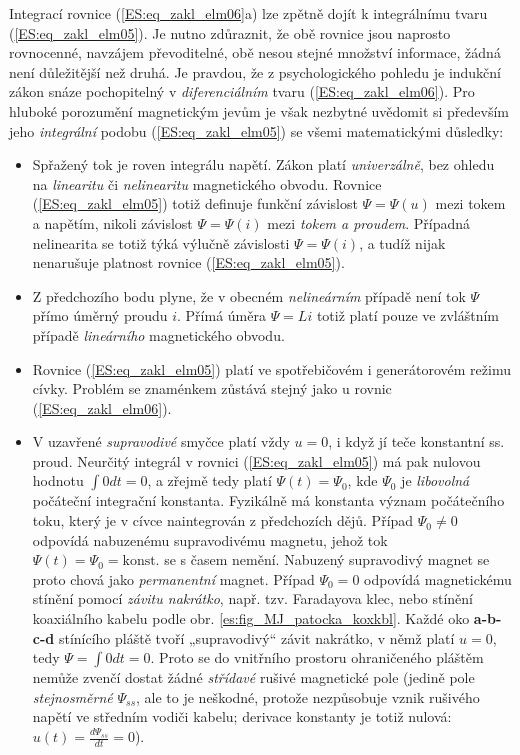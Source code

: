     Integrací rovnice (\ref{ES:eq_zakl_elm06}a) lze zpětně dojít k integrálnímu tvaru
    (\ref{ES:eq_zakl_elm05}). Je nutno zdůraznit, že obě rovnice jsou naprosto rovnocenné, navzájem
    převoditelné, obě nesou stejné množství informace, žádná není důležitější než druhá. Je
    pravdou, že z psychologického pohledu je indukční zákon snáze pochopitelný v
    \emph{diferenciálním} tvaru (\ref{ES:eq_zakl_elm06}). Pro hluboké porozumění magnetickým jevům
    je však nezbytné uvědomit si především jeho \emph{integrální} podobu (\ref{ES:eq_zakl_elm05})
    se všemi matematickými důsledky:
    \begin{itemize}
      \item Spřažený tok je roven integrálu napětí. Zákon platí \emph{univerzálně}, bez ohledu na
            \emph{linearitu} či \emph{nelinearitu} magnetického obvodu. Rovnice
            (\ref{ES:eq_zakl_elm05}) totiž definuje funkční závislost \(\Psi=\Psi(u)\) mezi tokem a
            napětím, nikoli závislost \(\Psi=\Psi(i)\) mezi \emph{tokem a proudem}.  Případná
            nelinearita se totiž týká výlučně závislosti \(\Psi=\Psi(i)\), a tudíž nijak nenarušuje
            platnost rovnice (\ref{ES:eq_zakl_elm05}).
      \item Z předchozího bodu plyne, že v obecném \emph{nelineárním} případě není tok \(\Psi\)
            přímo úměrný proudu \(i\). Přímá úměra \(\Psi = Li\) totiž platí pouze ve zvláštním
            případě \emph{lineárního} magnetického obvodu.
      \item Rovnice (\ref{ES:eq_zakl_elm05}) platí ve spotřebičovém i generátorovém režimu cívky.
            Problém se znaménkem zůstává stejný jako u rovnic (\ref{ES:eq_zakl_elm06}).
      \item V uzavřené \emph{supravodivé} smyčce platí vždy \(u = 0\), i když jí teče konstantní
            ss. proud. Neurčitý integrál v rovnici (\ref{ES:eq_zakl_elm05}) má pak nulovou hodnotu
            \(\int0dt=0\), a zřejmě tedy platí \(\Psi(t)=\Psi_0\), kde \(\Psi_0\) je
            \emph{libovolná} počáteční integrační konstanta. Fyzikálně má konstanta význam
            počátečního toku, který je v cívce naintegrován z předchozích dějů. Případ
            \(\Psi_0\neq0\) odpovídá nabuzenému supravodivému magnetu, jehož tok \(\Psi(t)=\Psi_0
            = \text{konst.}\) se s časem nemění. Nabuzený supravodivý magnet se proto chová jako
            \emph{permanentní} magnet. Případ \(\Psi_0 = 0\) odpovídá magnetickému stínění pomocí
            \emph{závitu nakrátko}, např. tzv. Faradayova klec, nebo stínění koaxiálního kabelu
            podle obr. \ref{es:fig_MJ_patocka_koxkbl}. Každé oko \textbf{a-b-c-d} stínícího pláště
            tvoří „supravodivý“ závit nakrátko, v němž platí \(u = 0\), tedy \(\Psi=\int0dt=0\).
            Proto se do vnitřního prostoru ohraničeného pláštěm nemůže zvenčí dostat žádné
            \emph{střídavé} rušivé magnetické pole (jedině pole \emph{stejnosměrné} \(\Psi_{ss}\),
            ale to je neškodné, protože nezpůsobuje vznik rušivého napětí ve středním vodiči
            kabelu; derivace konstanty je totiž nulová: \(u(t)=\frac{d\Psi_{ss}}{dt}=0\)).
    \end{itemize}

